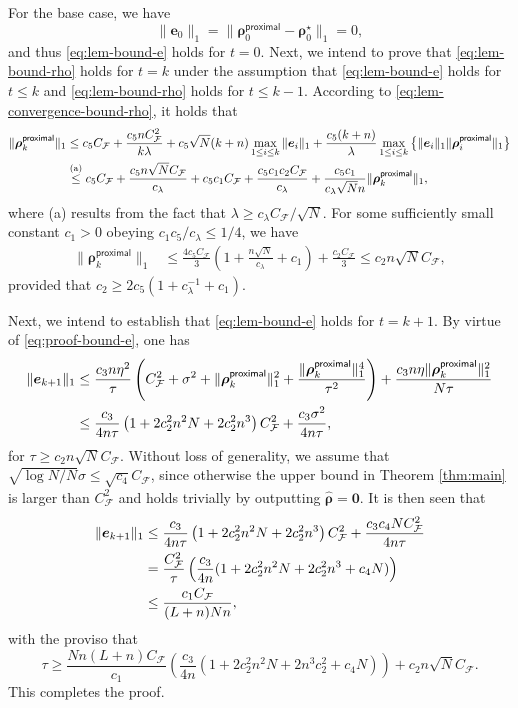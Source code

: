\documentclass[english]{article}
\begin{document}
For the base case, we have $$\|{\bm e}_0\|_1=\|{\bm \rho}_0^{\mathsf{proximal}} - {\bm \rho}_0^{\star}\|_1 = 0,$$ and thus \eqref{eq:lem-bound-e} holds for $t=0$.
Next, we intend to prove that \eqref{eq:lem-bound-rho} holds for $t=k$ under the assumption that \eqref{eq:lem-bound-e} holds for $t\le k$ and \eqref{eq:lem-bound-rho} holds for $t\le k-1$.
According to \eqref{eq:lem-convergence-bound-rho}, it holds that
%
\begin{align*}
\|{\bm \rho}_{k}^{\mathsf{proximal}}\|_1 &\le
c_5C_{\mathcal{F}}  + \frac{c_5nC_{\mathcal{F}}^2}{k\lambda} + c_5\sqrt{N}(k+n)\max_{1\le i\le k}\|{\bm e}_{i}\|_1 + \frac{c_5(k+n)}{\lambda}\max_{1\le i\le k}\big\{\|{\bm e}_i\|_1\|{\bm \rho}_i^{\mathsf{proximal}}\|_1\big\}\notag\\
&\overset{\text{(a)}}{\le} c_5C_{\mathcal{F}} + 
\frac{c_5n\sqrt{N}C_{\mathcal{F}}}{c_{\lambda}} + c_5c_1 C_{\mathcal{F}}
+ \frac{c_5c_1c_2C_{\mathcal{F}}}{c_{\lambda}}+ \frac{c_5c_1}{c_{\lambda}\sqrt{N}n}\|{\bm \rho}_k^{\mathsf{proximal}}\|_1,
\end{align*}
where (a) results from the fact that $\lambda\ge c_{\lambda}C_{\mathcal{F}}/\sqrt{N}$.
For some sufficiently small constant $c_1>0$ obeying $c_1c_5/c_{\lambda} \le 1/4$, we have
\begin{align*}
\|{\bm \rho}_{k}^{\mathsf{proximal}}\|_1 
&\le \frac{4c_5C_{\mathcal{F}}}{3}\left(1+\frac{n\sqrt{N}}{c_{\lambda}} + c_1\right) + \frac{c_2C_{\mathcal{F}}}{3}\le c_2n\sqrt{N}C_{\mathcal{F}},
\end{align*}
%
provided that $c_2\ge 2c_5\left(1+c_{\lambda}^{-1} + c_1\right)$.

Next, we intend to establish that \eqref{eq:lem-bound-e} holds for $t=k+1$.
By virtue of \eqref{eq:proof-bound-e}, one has
%
\begin{align*}
\|{\bm e}_{k+1}\|_1
&\le \frac{c_3n\eta^2}{\tau}\left(C_{\mathcal{F}}^2 + \sigma^2 + \|{\bm \rho}_k^{\mathsf{proximal}}\|_1^2 + \frac{\|{\bm \rho}_k^{\mathsf{proximal}}\|_1^4}{\tau^2}\right)+ \frac{c_3n\eta\|{\bm \rho}_k^{\mathsf{proximal}}\|_1^2}{N\tau}\notag\\
&\le \frac{c_3}{4n\tau}\left(1+2c_2^2n^2N+ 2c_2^2n^3\right)C_{\mathcal{F}}^2 + \frac{c_3\sigma^2}{4n\tau},
\end{align*}
for $\tau \ge c_2n\sqrt{N}C_{\mathcal{F}}$.
Without loss of generality, we assume that $\sqrt{\log N/N}\sigma \le \sqrt{c_4}C_{\mathcal{F}}$,
since otherwise the upper bound in Theorem \ref{thm:main} is larger than $C_{\mathcal{F}}^2$ and holds trivially by outputting $\widehat{\bm \rho} = {\bm 0}$.
It is then seen that
\begin{align*}
\|{\bm e}_{k+1}\|_1
&\le \frac{c_3}{4n\tau}\left(1+2c_2^2n^2N+ 2c_2^2n^3\right)C_{\mathcal{F}}^2  + \frac{c_3c_4NC_{\mathcal{F}}^2}{4n\tau}\notag\\
&=\frac{C_{\mathcal{F}}^2}{\tau}\left(\frac{c_3}{4n}(1+2c_2^2n^2N+ 2c_2^2n^3 + c_4N)\right)\notag\\
&\le \frac{c_1C_{\mathcal{F}}}{(L+n)Nn},
\end{align*}
%
with the proviso that 
%
$$
\tau \ge \frac{Nn(L+n)C_{\mathcal{F}}}{c_1}\left(\frac{c_3}{4n}(1+2c_2^2n^2N+ 2n^3c_2^2 + c_4N)\right) + c_2n\sqrt{N}C_{\mathcal{F}}.
$$
This completes the proof.
\end{document}
